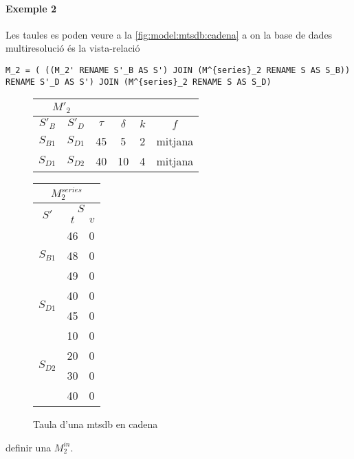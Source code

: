 \paragraph{Exemple 2}

Les taules es poden veure a la \autoref{fig:model:mtsdb:cadena} a on la base de dades multiresolució és la vista-relació 
\begin{verbatim}
M_2 = ( ((M_2' RENAME S'_B AS S') JOIN (M^{series}_2 RENAME S AS S_B)) RENAME S'_D AS S') JOIN (M^{series}_2 RENAME S AS S_D)
\end{verbatim}



\begin{figure}[tp]
  \centering
  \begin{tabular}{|c|c|c|c|c|c|}
    \multicolumn{2}{c}{$M'_2$} \\ \hline
    $S'_B$  & $S'_D$ & $\tau$ & $\delta$ & $k$ & $f$ \\ \hline
    $S_{B1}$ & $S_{D1}$ & 45 & 5  & 2 & mitjana  \\
    $S_{D1}$ & $S_{D2}$ & 40 & 10 & 4 & mitjana  \\ \hline
  \end{tabular}\qquad
  \begin{tabular}{|c|c|c|}
    \multicolumn{3}{c}{$M^{series}_{2}$} \\ \hline
    \multirow{2}{*}{$S'$}  &  \multicolumn{2}{c|}{$S$} \\ \cline{2-3}
    & $t$      & $v$  \\ \hline
    \multirow{3}{*}{$S_{B1}$} & 46 & 0 \\ 
    & 48 & 0 \\ 
    & 49 & 0 \\ \hline
    \multirow{2}{*}{$S_{D1}$} & 40 & 0 \\ 
    & 45 & 0 \\ \hline
    \multirow{4}{*}{$S_{D2}$} & 10 & 0 \\ 
    & 20 & 0 \\ 
    & 30 & 0 \\ 
    & 40 & 0 \\ \hline
  \end{tabular}
  \caption{Taula d'una mtsdb en cadena}
  \label{fig:model:mtsdb:cadena}
\end{figure}


definir una $M^{in}_2$.











